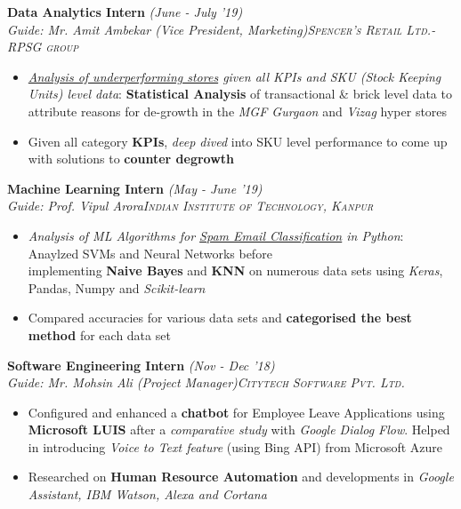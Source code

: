 \documentclass{article}
\begin{document}
\vspace{-3pt}
\textbf{Data Analytics Intern} \hfill{\sl \small (June - July '19)}
\vspace{-1pt}\\
{\it Guide: Mr. Amit Ambekar (Vice President, Marketing)}\hfill{\sl \small \textsc{Spencer's Retail Ltd.- RPSG group}}\\
\vspace{-17pt}
\begin{itemize}[itemsep = -1 mm, leftmargin=*]
    \item {\it \underline {Analysis of underperforming stores} given all KPIs and SKU (Stock Keeping Units) level data}: {\bf Statistical Analysis} of transactional \& brick level data to attribute reasons for de-growth in the {\it MGF Gurgaon} and {\it Vizag} hyper stores
     \item Given all category {\bf KPIs}, {\it deep dived} into SKU level performance to come up with solutions to {\bf counter degrowth}
\end{itemize}
\hspace*{-15pt}\textbf{Machine Learning Intern} \hfill{\sl \small (May - June '19)}\\
{\it Guide: Prof. Vipul Arora}\hfill{\sl \small \textsc{Indian Institute of Technology, Kanpur}}\\
\vspace{-19pt}
\begin{itemize}[itemsep = -1 mm, leftmargin=*]
    \item \textit{Analysis of ML Algorithms for \underline{Spam Email Classification} in Python}: Anaylzed SVMs and Neural Networks before\\implementing {\bf Naive Bayes} and {\bf KNN} on numerous data sets using {\it Keras}, Pandas, Numpy and {\it Scikit-learn}
      \item Compared accuracies for various data sets and {\bf categorised the best method} for each data set
\end{itemize}
\vspace{-5pt}
\textbf{Software Engineering Intern} \hfill{\sl \small (Nov - Dec '18)}\\
{\it Guide: Mr. Mohsin Ali (Project Manager)}\hfill{\sl \small \textsc{Citytech Software Pvt. Ltd.}}\\
\vspace{-19pt}
\begin{itemize}[itemsep = -1 mm, leftmargin=*]
  \item Configured and enhanced a {\bf chatbot} for Employee Leave Applications using {\bf Microsoft LUIS} after a {\sl comparative study} with {\it Google Dialog Flow}. Helped in introducing \textsl{Voice to Text feature} (using Bing API) from Microsoft Azure
  \item Researched on {\bf Human Resource Automation} and developments in \textit{Google Assistant, IBM Watson, Alexa and Cortana}
\end{itemize}
\end{document}
